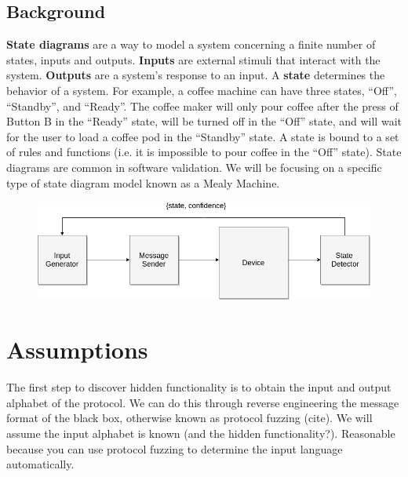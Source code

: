 \documentclass[11pt, a4paper]{article}
\begin{document}
\subsection*{Background}

\textbf{State diagrams} are a way to model a system concerning a finite number of states, inputs and outputs.
\textbf{Inputs} are external stimuli that interact with the system.
\textbf{Outputs} are a system's response to an input.
A \textbf{state} determines the behavior of a system.
For example, a coffee machine can have three states, ``Off'', ``Standby'', and ``Ready''.
The coffee maker will only pour coffee after the press of Button B in the ``Ready'' state, will be turned off in the ``Off'' state, and will wait for the user to load a coffee pod in the ``Standby'' state.
A state is bound to a set of rules and functions (i.e. it is impossible to pour coffee in the ``Off'' state).
State diagrams are common in software validation.
We will be focusing on a specific type of state diagram model known as a Mealy Machine.


\begin{figure}
    \centering
    \includegraphics[scale=0.5]{state-detector.png}
    \label{The system under active model learning.}
\end{figure}

\section{Assumptions}
The first step to discover hidden functionality is to obtain the input and output alphabet of the protocol.
We can do this through reverse engineering the message format of the black box, otherwise known as protocol fuzzing (cite).
We will assume the input alphabet is known (and the hidden functionality?).
Reasonable because you can use protocol fuzzing to determine the input language automatically.
\end{document}
